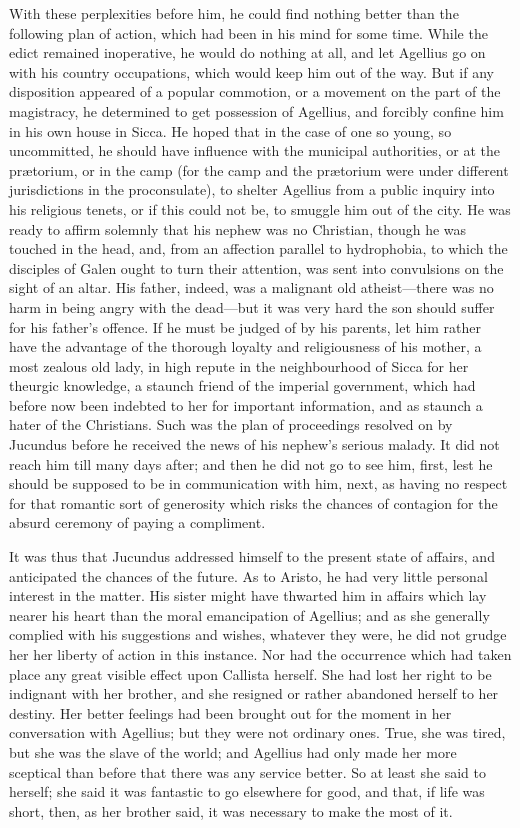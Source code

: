 With these perplexities before him, he could find nothing better
than the following plan of action, which had been in his mind for some
time. While the edict remained inoperative, he would do nothing at
all, and let Agellius go on with his country occupations, which would
keep him out of the way. But if any disposition appeared of a popular
commotion, or a movement on the part of the magistracy, he determined
to get possession of Agellius, and forcibly confine him in his
own house in Sicca. He hoped that in the case of one so young, so
uncommitted, he should have influence with the municipal authorities,
or at the prætorium, or in the camp (for the camp and the prætorium
were under different jurisdictions in the proconsulate), to shelter
Agellius from a public inquiry into his religious tenets, or if this
could not be, to smuggle him out of the city. He was ready to affirm
solemnly that his nephew was no Christian, though he was touched in
the head, and, from an affection parallel to hydrophobia, to which the
disciples of Galen ought to turn their attention, was sent into
convulsions on the sight of an altar. His father, indeed, was a
malignant old atheist—there was no harm in being angry with the dead—but
it was very hard the son should suffer for his father's offence. If he
must be judged of by his parents, let him rather have the advantage of
the thorough loyalty and religiousness of his mother, a most zealous
old lady, in high repute in the neighbourhood of Sicca for her
theurgic knowledge, a staunch friend of the imperial government, which
had before now been indebted to her for important information, and as
staunch a hater of the Christians. Such was the plan of proceedings
resolved on by Jucundus before he received the news of his nephew's
serious malady. It did not reach him till many days after; and then he
did not go to see him, first, lest he should be supposed to be in
communication with him, next, as having no respect for that romantic
sort of generosity which risks the chances of contagion for the
absurd ceremony of paying a compliment.

It was thus that Jucundus addressed himself to the present state of
affairs, and anticipated the chances of the future. As to Aristo, he
had very little personal interest in the matter. His sister might have
thwarted him in affairs which lay nearer his heart than the moral
emancipation of Agellius; and as she generally complied with his
suggestions and wishes, whatever they were, he did not grudge her her
liberty of action in this instance. Nor had the occurrence which had
taken place any great visible effect upon Callista herself. She had
lost her right to be indignant with her brother, and she resigned or
rather abandoned herself to her destiny. Her better feelings had been
brought out for the moment in her conversation with Agellius; but they
were not ordinary ones. True, she was tired, but she was the slave of
the world; and Agellius had only made her more sceptical than before
that there was any service better. So at least she said to herself;
she said it was fantastic to go elsewhere for good, and that, if life
was short, then, as her brother said, it was necessary to make the
most of it.

